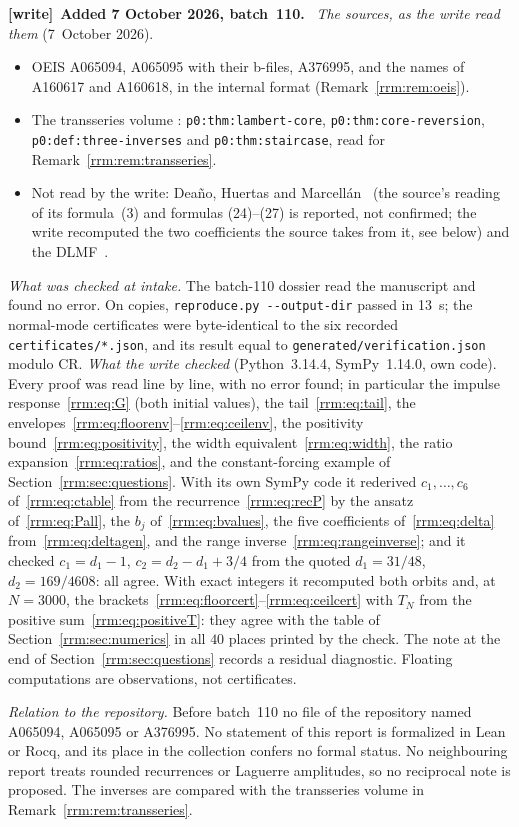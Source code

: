 \documentclass[11pt]{article}
\theoremstyle{remark}\newtheorem{remark}[theorem]{Remark}
\newcommand{\file}[1]{\nolinkurl{#1}}
\newenvironment{writenote}[1][]{\par\smallskip\begingroup\small
 \noindent\textbf{[write]}\if\relax\detokenize{#1}\relax\else~\textbf{#1.}\fi\ }%
 {\par\endgroup\smallskip}
\begin{document}
\begin{writenote}[Added 7 October 2026, batch~110]
\emph{The sources, as the write read them} (7~October 2026).
\begin{itemize}\raggedright
\item OEIS A065094, A065095 with their b-files, A376995, and the names of
 A160617 and A160618, in the internal format (Remark~\ref{rrm:rem:oeis}).
\item The transseries volume
 :
 \file{p0:thm:lambert-core}, \file{p0:thm:core-reversion},
 \file{p0:def:three-inverses} and \file{p0:thm:staircase}, read for
 Remark~\ref{rrm:rem:transseries}.
\item Not read by the write: Dea\~no, Huertas and Marcell\'an~\cite{dhm}
 (the source's reading of its formula~(3) and formulas (24)--(27) is
 reported, not confirmed; the write recomputed the two coefficients the
 source takes from it, see below) and the DLMF~\cite{dlmf}.
\end{itemize}

\emph{What was checked at intake.} The batch-110 dossier read the
manuscript and found no error. On copies, \file{reproduce.py --output-dir}
passed in 13~s; the normal-mode certificates were byte-identical to the six
recorded \file{certificates/*.json}, and its result equal to
\file{generated/verification.json} modulo CR. \emph{What the write checked}
(Python~3.14.4, SymPy~1.14.0, own code). Every proof was read line by line,
with no error found; in particular the impulse response~\eqref{rrm:eq:G}
(both initial values), the tail~\eqref{rrm:eq:tail}, the
envelopes~\eqref{rrm:eq:floorenv}--\eqref{rrm:eq:ceilenv}, the positivity
bound~\eqref{rrm:eq:positivity}, the width
equivalent~\eqref{rrm:eq:width}, the ratio expansion~\eqref{rrm:eq:ratios},
and the constant-forcing example of Section~\ref{rrm:sec:questions}. With its
own SymPy code it rederived $c_1,\dots,c_6$ of~\eqref{rrm:eq:ctable} from
the recurrence~\eqref{rrm:eq:recP} by the ansatz of~\eqref{rrm:eq:Pall}, the
$b_j$ of~\eqref{rrm:eq:bvalues}, the five coefficients
of~\eqref{rrm:eq:delta} from~\eqref{rrm:eq:deltagen}, and the
range inverse~\eqref{rrm:eq:rangeinverse}; and it checked
$c_1=d_1-1$, $c_2=d_2-d_1+3/4$ from the quoted $d_1=31/48$, $d_2=169/4608$:
all agree. With exact integers it recomputed both orbits and, at $N=3000$,
the brackets~\eqref{rrm:eq:floorcert}--\eqref{rrm:eq:ceilcert} with $T_N$ from
the positive sum~\eqref{rrm:eq:positiveT}: they agree with the table of
Section~\ref{rrm:sec:numerics} in all $40$ places printed by the check. The
note at the end of Section~\ref{rrm:sec:questions} records a residual
diagnostic. Floating computations are observations, not certificates.

\emph{Relation to the repository.} Before batch~110 no file of the
repository named A065094, A065095 or A376995. No statement of this report is
formalized in Lean or Rocq, and its place in the collection confers no
formal status. No neighbouring report treats rounded recurrences or Laguerre
amplitudes, so no reciprocal note is proposed. The inverses are compared with
the transseries volume in Remark~\ref{rrm:rem:transseries}.
\end{writenote}
\end{document}
